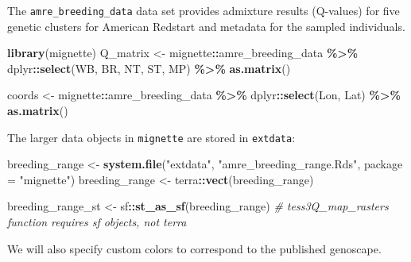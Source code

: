 \documentclass[
]{book}
\newenvironment{Shaded}{\begin{snugshade}}{\end{snugshade}}
\newcommand{\AttributeTok}[1]{\textcolor[rgb]{0.13,0.29,0.53}{#1}}
\newcommand{\CommentTok}[1]{\textcolor[rgb]{0.56,0.35,0.01}{\textit{#1}}}
\newcommand{\FunctionTok}[1]{\textcolor[rgb]{0.13,0.29,0.53}{\textbf{#1}}}
\newcommand{\NormalTok}[1]{#1}
\newcommand{\OtherTok}[1]{\textcolor[rgb]{0.56,0.35,0.01}{#1}}
\newcommand{\SpecialCharTok}[1]{\textcolor[rgb]{0.81,0.36,0.00}{\textbf{#1}}}
\newcommand{\StringTok}[1]{\textcolor[rgb]{0.31,0.60,0.02}{#1}}
\begin{document}
The \texttt{amre\_breeding\_data} data set provides admixture results (Q-values) for five genetic clusters for American Redstart \citep{desaix2023low} and metadata for the sampled individuals.

\begin{Shaded}
\begin{Highlighting}[]
\FunctionTok{library}\NormalTok{(mignette)}
\NormalTok{Q\_matrix }\OtherTok{\textless{}{-}}\NormalTok{ mignette}\SpecialCharTok{::}\NormalTok{amre\_breeding\_data }\SpecialCharTok{\%\textgreater{}\%}
\NormalTok{  dplyr}\SpecialCharTok{::}\FunctionTok{select}\NormalTok{(WB, BR, NT, ST, MP) }\SpecialCharTok{\%\textgreater{}\%}
  \FunctionTok{as.matrix}\NormalTok{()}

\NormalTok{coords }\OtherTok{\textless{}{-}}\NormalTok{ mignette}\SpecialCharTok{::}\NormalTok{amre\_breeding\_data }\SpecialCharTok{\%\textgreater{}\%}
\NormalTok{  dplyr}\SpecialCharTok{::}\FunctionTok{select}\NormalTok{(Lon, Lat) }\SpecialCharTok{\%\textgreater{}\%}
  \FunctionTok{as.matrix}\NormalTok{()}
\end{Highlighting}
\end{Shaded}

The larger data objects in \texttt{mignette} are stored in \texttt{extdata}:

\begin{Shaded}
\begin{Highlighting}[]
\NormalTok{breeding\_range }\OtherTok{\textless{}{-}} \FunctionTok{system.file}\NormalTok{(}\StringTok{"extdata"}\NormalTok{, }\StringTok{"amre\_breeding\_range.Rds"}\NormalTok{, }\AttributeTok{package =} \StringTok{"mignette"}\NormalTok{)}
\NormalTok{breeding\_range }\OtherTok{\textless{}{-}}\NormalTok{ terra}\SpecialCharTok{::}\FunctionTok{vect}\NormalTok{(breeding\_range)}
  
\NormalTok{breeding\_range\_st }\OtherTok{\textless{}{-}}\NormalTok{ sf}\SpecialCharTok{::}\FunctionTok{st\_as\_sf}\NormalTok{(breeding\_range) }\CommentTok{\# tess3Q\_map\_rasters function requires sf objects, not terra}
\end{Highlighting}
\end{Shaded}

We will also specify custom colors to correspond to the published genoscape.
\end{document}
